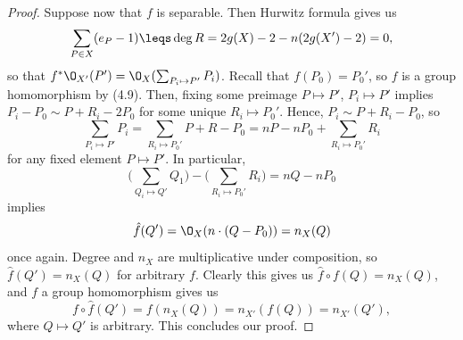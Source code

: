 \documentclass[12pt]{amsart}
\begin{document}
\begin{proof}
  Suppose now that $f$ is separable.
  Then Hurwitz formula gives us
  \[
    \sum_{P\in X}(e_P-1)\leqs \deg R = 2g(X)-2 - n(2g(X')-2) = 0,
  \] 
  so that $f^*\O_{X'}(P') = \O_X(\sum_{P_i\mapsto P'} P_i)$.
  Recall that $f(P_0)=P_0'$, so $f$ is a group homomorphism by (4.9).
  Then, fixing some preimage $P\mapsto P'$, $P_i\mapsto P'$ implies $P_i-P_0\sim P+R_i - 2P_0$ for some unique $R_i\mapsto P_0'$.
  Hence, $P_i\sim P+R_i - P_0$, so
  \[
    \sum_{P_i\mapsto P'} P_i = \sum_{R_i\mapsto P_0'} P+ R - P_0 = nP -nP_0 + \sum_{R_i\mapsto P_0'} R_i
  \] 
  for any fixed element $P\mapsto P'$.
  In particular,
  \[
    \Bigg(\sum_{Q_i\mapsto Q'} Q_1 \Bigg) - \Bigg(\sum_{R_i\mapsto P_0'}R_i\Bigg) = nQ - nP_0
  \] 
  implies
  \[
    \hat f(Q') = \O_X(n\cdot(Q-P_0)) = n_X(Q)
  \] 
  once again.
  Degree and $n_X$ are multiplicative under composition, so $\hat f(Q')= n_X(Q)$ for arbitrary $f$.
  Clearly this gives us $\hat f\circ f(Q)= n_X(Q)$, and $f$ a group homomorphism gives us 
  \[
    f\circ \hat f(Q')= f(n_X(Q)) = n_{X'}(f(Q))= n_{X'}(Q'),
  \]
  where $Q\mapsto Q'$ is arbitrary.
  This concludes our proof.
\end{proof}
\end{document}
